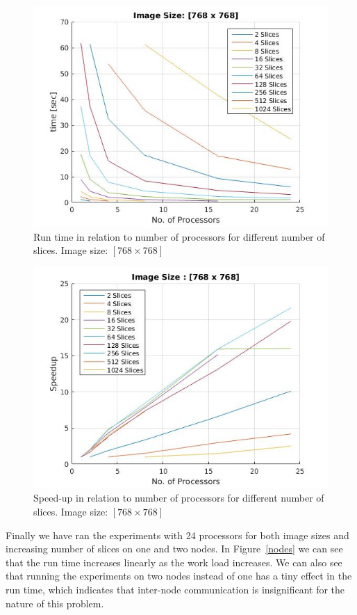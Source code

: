 \documentclass[a4paper,12pt]{article}
\begin{document}
\begin{figure}
  \centering
  \includegraphics[scale=0.8]{small_one_node_1.jpg}
  \caption{Run time in relation to number of processors for different number of slices. Image size: $[768 \times 768]$}
  \label{s_one_n}
\end{figure}

\begin{figure}
  \centering
  \includegraphics[scale=0.8]{small_one_node_speedup.jpg}
  \caption{Speed-up in relation to number of processors for different number of slices. Image size: $[768 \times 768]$}
  \label{s_one_n_speed}
\end{figure}

Finally we have ran the experiments with 24 processors for both image sizes and increasing number of slices on one and two nodes. In Figure~\ref{nodes} we can see that the run time increases linearly as the work load increases. We can also see that running the experiments on two nodes instead of one has a tiny effect in the run time, which indicates that inter-node communication is insignificant for the nature of this problem.
\end{document}
